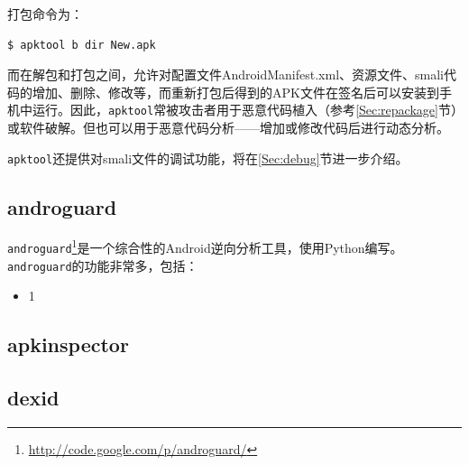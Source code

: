 打包命令为：
\begin{lstlisting}[language=bash, numbers=none]
 $ apktool b dir New.apk
\end{lstlisting}

而在解包和打包之间，允许对配置文件AndroidManifest.xml、资源文件、smali代码的增加、删除、修改等，而重新打包后得到的APK文件在签名后可以安装到手机中运行。因此，\lstinline!apktool!常被攻击者用于恶意代码植入（参考\ref{Sec:repackage}节）或软件破解。但也可以用于恶意代码分析——增加或修改代码后进行动态分析。

\lstinline!apktool!还提供对smali文件的调试功能，将在\ref{Sec:debug}节进一步介绍。

\subsection{androguard}
\lstinline!androguard!\footnote{\url{http://code.google.com/p/androguard/}}是一个综合性的Android逆向分析工具，使用Python编写。\lstinline!androguard!的功能非常多，包括：
\begin{itemize}
  \item 1
\end{itemize}

\subsection{apkinspector}

\subsection{dexid}

